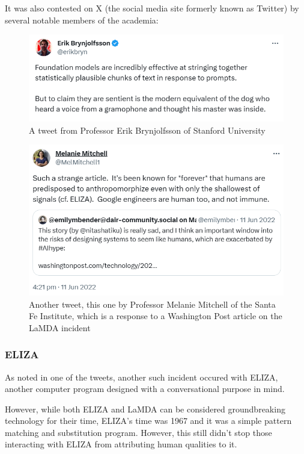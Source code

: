 \documentclass[masterthesis]{fer}
\begin{document}
It was also contested on X (the social media site formerly known as Twitter) by several notable members of the academia:
\begin{figure}[htb]
  \centering
  \includegraphics[width=1\linewidth]{Figures/LaMDA tweet 1.png} 
  \caption{A tweet from Professor Erik Brynjolfsson of Stanford University}
  \label{slk:LaMDA_tweet_1}
\end{figure}
\begin{figure}[htb]
  \centering
  \includegraphics[width=1\linewidth]{Figures/LaMDA tweet 2.png} 
  \caption{Another tweet, this one by Professor Melanie Mitchell of the Santa Fe Institute, which is a response to a Washington Post article on the LaMDA incident}
  \label{slk:LaMDA_tweet_2}
\end{figure}

\subsubsection{ELIZA}

As noted in one of the tweets, another such incident occured with ELIZA, another computer program designed with a conversational purpose in mind.

However, while both ELIZA and LaMDA can be considered groundbreaking technology for their time, ELIZA's time was 1967 and it was a simple pattern matching and substitution program. However, this still didn't stop those interacting with ELIZA from attributing human qualities to it.
\end{document}

